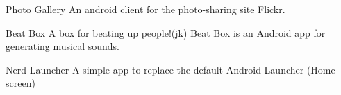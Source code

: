 \begin{cventries}
	
	\cventry
	{\faAndroid\enspace Photo Gallery}
	{}
	{}
	{}
	{An android client for the photo-sharing site Flickr.}
	
	\cventry
	{\faAndroid\enspace Beat Box}
	{}
	{}
	{}
	{A box for beating up people!(jk) Beat Box is an Android app for generating musical sounds.}
		
	\cventry
	{\faAndroid\enspace Nerd Launcher}
	{}
	{}
	{}
	{A simple app to replace the default Android Launcher (Home screen)}
		
		
		



\end{cventries}
